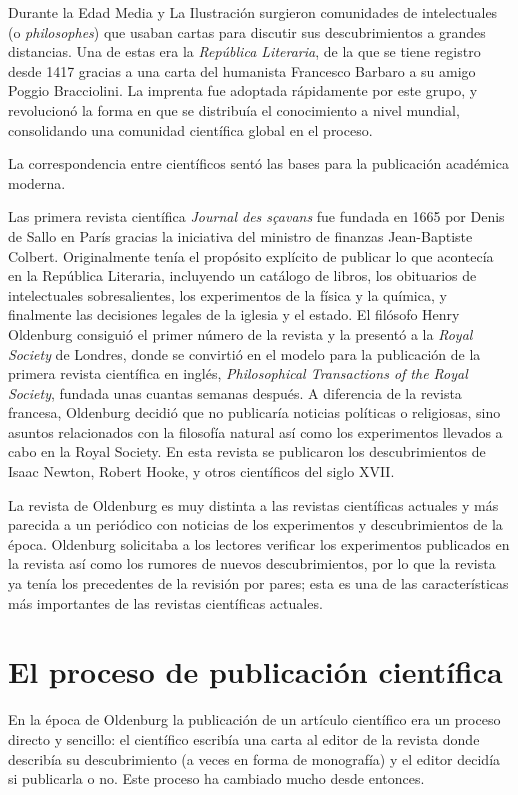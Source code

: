 Durante la Edad Media y La Ilustración surgieron comunidades de intelectuales (o
\emph{philosophes}) que usaban cartas para discutir sus descubrimientos a
grandes distancias.
Una de estas era la \emph{República Literaria}, de la que se tiene registro
desde 1417 gracias a una carta del humanista Francesco Barbaro a su amigo Poggio
Bracciolini.
La imprenta fue adoptada rápidamente por este grupo, y revolucionó la forma en
que se distribuía el conocimiento a nivel mundial, consolidando una comunidad
científica global en el proceso.

\begin{remember}
    La correspondencia entre científicos sentó las bases para la publicación
    académica moderna.
\end{remember}

Las primera revista científica \emph{Journal des sçavans} fue fundada en 1665
por Denis de Sallo en París gracias la iniciativa del ministro de finanzas
Jean-Baptiste Colbert.
Originalmente tenía el propósito explícito de publicar lo que acontecía en la
República Literaria, incluyendo un catálogo de libros, los obituarios de
intelectuales sobresalientes, los experimentos de la física y la química, y
finalmente las decisiones legales de la iglesia y el estado\cite{Fyfe2022-ca}.
El filósofo Henry Oldenburg consiguió el primer número de la revista y la
presentó a la \emph{Royal Society} de Londres, donde se convirtió en el modelo
para la publicación de la primera revista científica en inglés,
\emph{Philosophical Transactions of the Royal Society}, fundada unas cuantas
semanas después.
A diferencia de la revista francesa, Oldenburg decidió que no publicaría
noticias políticas o religiosas, sino asuntos relacionados con la filosofía
natural así como los experimentos llevados a cabo en la Royal Society.
En esta revista se publicaron los descubrimientos de Isaac Newton, Robert Hooke,
y otros científicos del siglo XVII.

La revista de Oldenburg es muy distinta a las revistas científicas actuales y
más parecida a un periódico con noticias de los experimentos y descubrimientos
de la época.
Oldenburg solicitaba a los lectores verificar los experimentos publicados en la
revista así como los rumores de nuevos descubrimientos, por lo que la revista
ya tenía los precedentes de la revisión por pares; esta es una de las
características más importantes de las revistas científicas actuales.

\section{El proceso de publicación científica}
\label{sec:procesopublicacion}
En la época de Oldenburg la publicación de un artículo científico era un proceso
directo y sencillo: el científico escribía una carta al editor de la revista
donde describía su descubrimiento (a veces en forma de monografía) y el editor
decidía si publicarla o no.
Este proceso ha cambiado mucho desde entonces.

